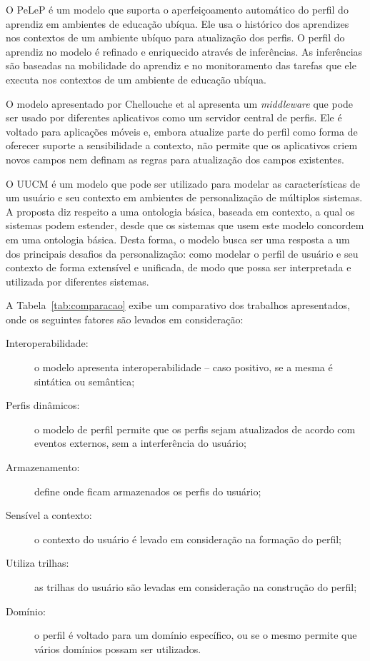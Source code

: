 O PeLeP\cite{pelep} é um modelo que suporta o aperfeiçoamento automático do perfil do aprendiz em ambientes de educação ubíqua. Ele usa o histórico dos aprendizes nos contextos de um ambiente ubíquo para atualização dos perfis. O perfil do aprendiz no modelo é refinado e enriquecido através de inferências. As inferências são baseadas na mobilidade do aprendiz e no monitoramento das tarefas que ele executa nos contextos de um ambiente de educação ubíqua.

O modelo apresentado por Chellouche et al\cite{chellouche10} apresenta um \emph{middleware} que pode ser usado por diferentes aplicativos como um servidor central de perfis. Ele é voltado para aplicações móveis e, embora atualize parte do perfil como forma de oferecer suporte a sensibilidade a contexto, não permite que os aplicativos criem novos campos nem definam as regras para atualização dos campos existentes.

O UUCM\cite{niederee04} é um modelo que pode ser utilizado para modelar as características de um usuário e seu contexto em ambientes de personalização de múltiplos sistemas. A proposta diz respeito a uma ontologia básica, baseada em contexto, a qual os sistemas podem estender, desde que os sistemas que usem este modelo concordem em uma ontologia básica. Desta forma, o modelo busca ser uma resposta a um dos principais desafios da personalização: como modelar o perfil de usuário e seu contexto de forma extensível e unificada, de modo que possa ser interpretada e utilizada por diferentes sistemas.

A Tabela~\ref{tab:comparacao} exibe um comparativo dos trabalhos apresentados, onde os seguintes fatores são levados em consideração:

\begin{description}
  \item[Interoperabilidade:] o modelo apresenta interoperabilidade -- caso positivo, se a mesma é sintática ou semântica;
  \item[Perfis dinâmicos:] o modelo de perfil permite que os perfis sejam atualizados de acordo com eventos externos, sem a interferência do usuário;
  \item[Armazenamento:] define onde ficam armazenados os perfis do usuário;
  \item[Sensível a contexto:] o contexto do usuário é levado em consideração na formação do perfil;
  \item[Utiliza trilhas:] as trilhas do usuário são levadas em consideração na construção do perfil;
  \item[Domínio:] o perfil é voltado para um domínio específico, ou se o mesmo permite que vários domínios possam ser utilizados.
\end{description}

